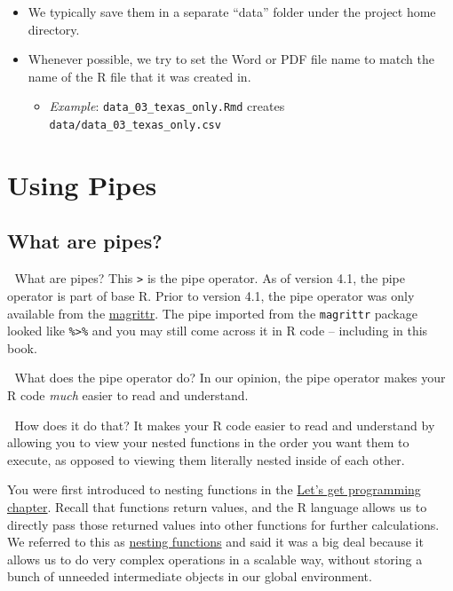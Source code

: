 \documentclass[
  letterpaper,
  DIV=11,
  numbers=noendperiod]{scrreprt}
\providecommand{\tightlist}{%
  \setlength{\itemsep}{0pt}\setlength{\parskip}{0pt}}\usepackage{longtable,booktabs,array}
\begin{document}
\begin{itemize}
  \begin{itemize}
  \tightlist
  \item
    We typically save them in a separate ``data'' folder under the
    project home directory.
  \item
    Whenever possible, we try to set the Word or PDF file name to match
    the name of the R file that it was created in.

    \begin{itemize}
    \tightlist
    \item
      \emph{Example}: \texttt{data\_03\_texas\_only.Rmd} creates
      \texttt{data/data\_03\_texas\_only.csv}
    \end{itemize}
  \end{itemize}
\end{itemize}

\chapter{Using Pipes}\label{using-pipes}

\section{What are pipes?}\label{what-are-pipes}

🤔 What are pipes? This \texttt{\textbar{}\textgreater{}} is the pipe
operator. As of version 4.1, the pipe operator is part of base R. Prior
to version 4.1, the pipe operator was only available from the
\href{https://magrittr.tidyverse.org/}{magrittr}. The pipe imported from
the \texttt{magrittr} package looked like \texttt{\%\textgreater{}\%}
and you may still come across it in R code -- including in this book.

🤔 What does the pipe operator do? In our opinion, the pipe operator
makes your R code \emph{much} easier to read and understand.

🤔 How does it do that? It makes your R code easier to read and
understand by allowing you to view your nested functions in the order
you want them to execute, as opposed to viewing them literally nested
inside of each other.

You were first introduced to nesting functions in the
\hyperref[nesting-functions]{Let's get programming chapter}. Recall that
functions return values, and the R language allows us to directly pass
those returned values into other functions for further calculations. We
referred to this as \hyperref[glossary-nesting-functions]{nesting
functions} and said it was a big deal because it allows us to do very
complex operations in a scalable way, without storing a bunch of
unneeded intermediate objects in our global environment.
\end{document}

